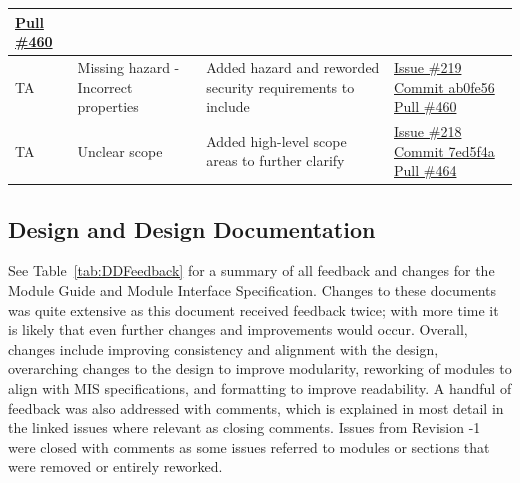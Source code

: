\documentclass[12pt, titlepage]{article}
\begin{document}
\begin{longtable}{|p{2cm}|p{4cm}|p{5cm}|p{3cm}|}
\newline\href{https://github.com/OmarHassanAdelhamid/Five-of-a-Kind-capstone-project-/pull/460}{Pull \#460} \\ \hline
TA & Missing hazard - Incorrect properties & Added hazard and reworded security requirements to include & \href{https://github.com/OmarHassanAdelhamid/Five-of-a-Kind-capstone-project-/issues/219}{Issue \#219}
\newline\href{https://github.com/OmarHassanAdelhamid/Five-of-a-Kind-capstone-project-/pull/460/commits/ab0fe5610fd5f6aec7be4830c39b80b6081480b5}{Commit ab0fe56}
\newline\href{https://github.com/OmarHassanAdelhamid/Five-of-a-Kind-capstone-project-/pull/460}{Pull \#460} \\ \hline
TA & Unclear scope & Added high-level scope areas to further clarify & \href{https://github.com/OmarHassanAdelhamid/Five-of-a-Kind-capstone-project-/issues/218}{Issue \#218}
\newline\href{https://github.com/OmarHassanAdelhamid/Five-of-a-Kind-capstone-project-/pull/464/commits/7ed5f4a6ce8723e48c76929e7634bcc6f78f03f0}{Commit 7ed5f4a}
\newline\href{https://github.com/OmarHassanAdelhamid/Five-of-a-Kind-capstone-project-/pull/464}{Pull \#464} \\ \hline

\end{longtable}

\subsection{Design and Design Documentation}

See Table~\ref{tab:DDFeedback} for a summary of all feedback and changes for the Module Guide and Module
Interface Specification. Changes to these documents was quite extensive as this document received feedback twice;
with more time it is likely that even further changes and improvements would occur. Overall, changes include improving
consistency and alignment with the design, overarching changes to the design to improve modularity, reworking of modules
to align with MIS specifications, and formatting to improve readability. A handful of feedback was also addressed with comments,
which is explained in most detail in the linked issues where relevant as closing comments. Issues from Revision -1 were closed
with comments as some issues referred to modules or sections that were removed or entirely reworked.
\end{document}
